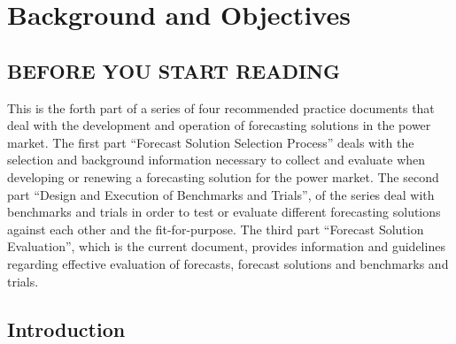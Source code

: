 \chapter{Background and Objectives } \label{ch:introduction}

\noindent
\begin{comment}
\begin{tcolorbox}
\parbox{\textwidth}{
\emph{\textbf{Key Points}\\
This is the fourth part of a series of four recommended practice documents that deals with the development and operation of renewable energy forecasting solutions for the power market.
This part provides information and guidelines for the best practices of met measurements in the real-time operation of grid operators....
}}
\end{tcolorbox}
\end{comment}
{}

\section{BEFORE YOU START READING}

This is the forth part of a series of four recommended practice documents that deal with the development and operation of forecasting solutions in the power market. 
The first part  “Forecast Solution Selection Process” deals with the selection and background information necessary to collect and evaluate when developing or renewing a forecasting solution for the power market. 
The second part “Design and Execution of Benchmarks and Trials”, of the series deal with benchmarks and trials in order to test or evaluate different forecasting solutions against each other and the fit-for-purpose. 
The third part “Forecast Solution Evaluation”, which is the current document, provides information and guidelines regarding effective evaluation of forecasts, forecast solutions and benchmarks and trials.


\section{Introduction {\color{magenta}{Contributing author: COM}}}

